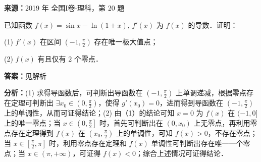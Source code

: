 \begin{question}[points=12]
\textbf{来源：}2019 年 全国I卷-理科，第 20 题\par
已知函数 $f(x) = \sin x - \ln(1 + x)$, $f'(x)$ 为 $f(x)$ 的导数．证明：

(1) $f'(x)$ 在区间 $\left(-1, \frac{\pi}{2}\right)$ 存在唯一极大值点；

(2) $f(x)$ 有且仅有 $2$ 个零点．
\begin{solution}
\textbf{答案：}见解析

\textbf{分析：}(1) 求得导函数后，可判断出导函数在 $\left(-1, \frac{\pi}{2}\right)$ 上单调递减，根据零点存在定理可判断出 $\exists x_0 \in \left(0, \frac{\pi}{2}\right)$，使得 $g'(x_0) = 0$，进而得到导函数在 $\left(-1, \frac{\pi}{2}\right)$ 上的单调性，从而可证得结论；(2) 由（1）的结论可知 $x = 0$ 为 $f(x)$ 在 $(-1, 0]$ 上的唯一零点；当 $x \in \left(0, \frac{\pi}{2}\right]$ 时，首先可判断出在 $(0, x_0)$ 上无零点，再利用零点存在定理得到 $f(x)$ 在 $\left(x_0, \frac{\pi}{2}\right)$ 上的单调性，可知 $f(x) > 0$，不存在零点；当 $x \in \left[\frac{\pi}{2}, \pi\right]$ 时，利用零点存在定理和 $f(x)$ 单调性可判断出存在唯一一个零点；当 $x \in (\pi, +\infty)$，可证得 $f(x) < 0$；综合上述情况可证得结论．


\end{solution}
\end{question}
